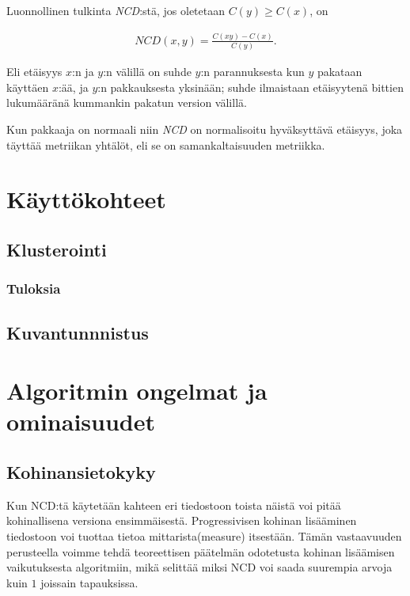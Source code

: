 \documentclass[11pt,finnish]{tktltiki2}
\theoremstyle{definition}
\theoremstyle{remark}
\begin{document}
  Luonnollinen tulkinta \emph{NCD}:stä, jos oletetaan $C(y) \geq C(x)$, on

  \begin{align}
    NCD(x,y) = \frac{C(xy)-C(x)}{C(y)}.
 \end{align}

  Eli etäisyys $x$:n ja $y$:n välillä on suhde $y$:n parannuksesta kun $y$ pakataan käyttäen $x$:ää, ja $y$:n pakkauksesta yksinään; suhde ilmaistaan etäisyytenä bittien lukumääränä kummankin pakatun version välillä.

  Kun pakkaaja on normaali niin \emph{NCD} on normalisoitu hyväksyttävä etäisyys, joka täyttää metriikan yhtälöt, eli se on samankaltaisuuden metriikka.



\section{Käyttökohteet} %
\label{sec:k_ytt_kohteet}
  \subsection{Klusterointi} %
  \label{sub:klusterointi}
    \subsubsection{Tuloksia} %
    \label{ssub:tuloksia}

  \subsection{Kuvantunnnistus} %
  \label{sub:kuvantunnnistus}


\section{Algoritmin ongelmat ja ominaisuudet} %
\label{sec:algoritmin_ongelmat_ja_ominaisuudet}
  \subsection{Kohinansietokyky} %
  \label{sub:kohinansietokyky}
    Kun NCD:tä käytetään kahteen eri tiedostoon toista näistä voi pitää kohinallisena versiona ensimmäisestä. Progressivisen kohinan lisääminen tiedostoon voi tuottaa tietoa mittarista(measure) itsestään. Tämän vastaavuuden perusteella voimme tehdä teoreettisen päätelmän odotetusta kohinan lisäämisen vaikutuksesta algoritmiin, mikä selittää miksi NCD voi saada suurempia arvoja kuin $1$ joissain tapauksissa. \cite{4167725}
\end{document}
